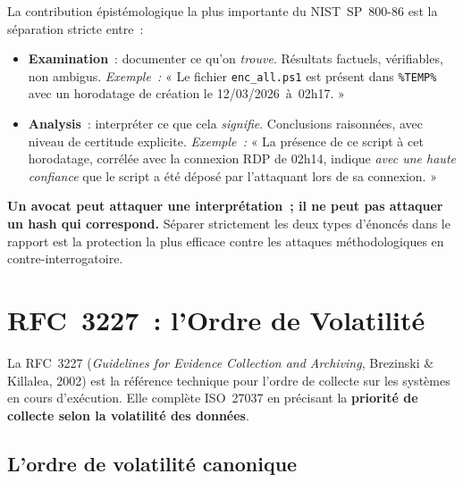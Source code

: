 La contribution épistémologique la plus importante du NIST~SP~800-86 est la
séparation stricte entre~:
\begin{itemize}
    \item \textbf{Examination}~: documenter ce qu'on \emph{trouve}.
          Résultats factuels, vérifiables, non ambigus. \emph{Exemple~:}
          « Le fichier \texttt{enc\_all.ps1} est présent dans
          \texttt{\%TEMP\%} avec un horodatage de création le
          12/03/2026~à~02h17. »
    \item \textbf{Analysis}~: interpréter ce que cela \emph{signifie}.
          Conclusions raisonnées, avec niveau de certitude explicite.
          \emph{Exemple~:} « La présence de ce script à cet horodatage,
          corrélée avec la connexion RDP de 02h14, indique \emph{avec
          une haute confiance} que le script a été déposé par l'attaquant
          lors de sa connexion. »
\end{itemize}

\begin{boxalert}
\textbf{Un avocat peut attaquer une interprétation~; il ne peut pas attaquer
un hash qui correspond.} Séparer strictement les deux types d'énoncés dans
le rapport est la protection la plus efficace contre les attaques méthodologiques
en contre-interrogatoire.
\end{boxalert}

\section{RFC~3227~: l'Ordre de Volatilité}
\label{sec:rfc3227}

La RFC~3227 (\textit{Guidelines for Evidence Collection and Archiving},
Brezinski \& Killalea, 2002) est la référence technique pour l'ordre de
collecte sur les systèmes en cours d'exécution. Elle complète ISO~27037
en précisant la \textbf{priorité de collecte selon la volatilité des données}.

\subsection{L'ordre de volatilité canonique}

